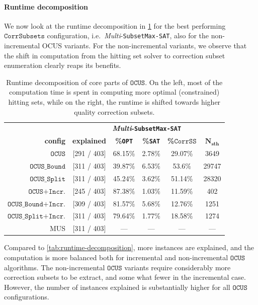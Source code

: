 \documentclass[twoside,11pt]{article}
\newcommand\mm[1]{\ensuremath{#1}\xspace}
\newcommand\call[1]{\mm{\texttt{#1}}}
\newcommand\sat{\texttt{{SAT}}\xspace}
\newcommand\subsetmaxsat{\texttt{SubsetMax-SAT}}
\newcommand\comus{\mm{\call{OCUS}}}
\newcommand{\comusbound}{\mm{\call{OCUS\_Bound}}}
\newcommand\comusincr{\mm{\call{OCUS+Incr.}}}
\newcommand\ousbiter{\mm{\call{OCUS\_Split}}}
\newcommand\ousbincr{\mm{\call{OCUS\_Bound+Incr.}}}
\newcommand\ousbiterincr{\mm{\call{OCUS\_Split+Incr.}}}
\newcommand\corrss{\mm{\call{CorrSS}}}
\newcommand\corrsubsets{\mm{\call{CorrSubsets}}}
\newcommand\multisubsetmaxsat{\emph{Multi}-\subsetmaxsat\xspace}
\begin{document}
\paragraph{Runtime decomposition} We now look at the runtime decomposition in \cref{tab:runtime-decomposition-corr-susbet-enum} for the best performing \corrsubsets configuration, i.e.~\multisubsetmaxsat, also for the non-incremental OCUS variants. 
For the non-incremental variants, we observe that the shift in computation from the hitting set solver to correction subset enumeration clearly reaps its benefits. 


\begin{table}[!h]
	\centering
	\begin{tabular}{r|c|c|c|c|c}
		&  \multicolumn{5}{c}{\textbf{\emph{Multi}-\subsetmaxsat}}\\[1ex]
		\textbf{config}          & \textbf{explained}  &  \textbf{\%\texttt{OPT}} &   \textbf{\%\sat} & \textbf{\%\corrss} &  $\mathbf{N_{sth}}$   \\ \midrule 
		\comus                  & [291 / 403] & 68.15\% & 2.78\%  &    29.07\% &      3649 \\
		\comusbound             & [311 / 403] & 39.87\% & 6.53\%  &     53.6\% &     29747 \\
		\ousbiter               & [311 / 403] & 45.24\% & 3.62\%  &    51.14\% &     28320 \\ \hline
		\comusincr              & [245 / 403] & 87.38\% & 1.03\%  &    11.59\% &       402 \\
		\ousbincr  		        & [309 / 403] & 81.57\% & 5.68\%  &    12.76\% &      1251 \\
		\ousbiterincr           & [311 / 403] & 79.64\% & 1.77\%  &    18.58\% &      1274 \\ \hline
		MUS                     & [311 / 403] &    --- &       ---&          ---&      --- \\
	\end{tabular}
	\caption{Runtime decomposition of core parts of \call{OCUS}. On the left, most of the computation time is spent in computing more optimal (constrained) hitting sets, while on the right, the runtime is shifted towards higher quality correction subsets.}
	\label{tab:runtime-decomposition-corr-susbet-enum}
\end{table}

Compared to \cref{tab:runtime-decomposition}, more instances are explained, and the computation is more balanced both for incremental and non-incremental \comus algorithms.
The non-incremental \comus variants require considerably more correction subsets to be extract, and some what fewer in the incremental case. 
However, the number of instances explained is substantially higher for all \comus configurations.
\end{document}
